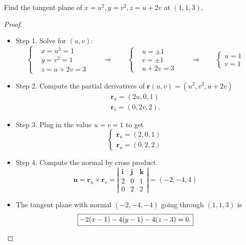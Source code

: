 \begin{example} Find the tangent plane of $x = u^2, y=v^2, z = u+2v$ at $(1,1,3)$.
\end{example}
\begin{proof} \quad 
\begin{itemize}
    \item Step 1. Solve for $(u,v)$: 
    \begin{equation*}
        \begin{cases}
            & x = u^2 = 1\\
            & y = v^2 = 1\\
            & z = u + 2v = 3
        \end{cases} \qquad\Longrightarrow\qquad \begin{cases}
            & u = \pm 1\\
            & v = \pm 1\\
            & u+2v = 3
        \end{cases} \qquad\Longrightarrow\qquad \begin{cases}
            u = 1\\
            v = 1
        \end{cases}
    \end{equation*}
    \item Step 2. Compute the partial derivatives of $\textbf{r}(u,v) = (u^2, v^2, u+2v)$
    \begin{align*}
        \textbf{r}_u = (2u, 0, 1)\\
        \textbf{r}_v = (0, 2v, 2).
    \end{align*}
    \item Step 3. Plug in the value $u=v=1$ to get 
    \begin{equation*}
        \begin{cases}
            \textbf{r}_u = (2, 0, 1)\\
            \textbf{r}_u = (0, 2, 2)
        \end{cases} 
    \end{equation*}
    \item Step 4. Compute the normal by cross product
    \begin{equation*}
        \textbf{n} = \textbf{r}_u \times \textbf{r}_v = 
        \left|
    \begin{array}{ccc}
         \textbf{i}& \textbf{j} & \textbf{k}  \\
         2 &  0 & 1\\
         0 &  2 & 2
    \end{array}
    \right| = (-2, -4, 4)
    \end{equation*}
    \item The tangent plane with normal $(-2,-4,-4)$ going through $(1,1,3)$ is
    \begin{equation*}
        \fbox{$\displaystyle 
        -2(x-1) - 4(y-1) - 4(z-3) = 0.
        $}
    \end{equation*}
\end{itemize}
\end{proof}


